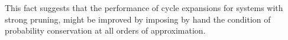 {%
%
%
%
%
%
%
%
This fact suggests that the performance
of cycle expansions for systems with strong pruning,
might be improved by imposing by hand the condition of
probability conservation at all orders of approximation.

}
